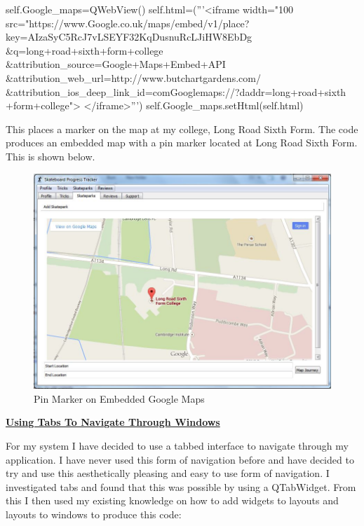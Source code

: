 \begin{python}
self.Google_maps=QWebView()
self.html=('''<iframe width="100%
src="https://www.Google.co.uk/maps/embed/v1/place?
	key=AIzaSyC5RcJ7vLSEYF32KqDusnuRcLJiHW8EbDg
	&q=long+road+sixth+form+college
	&attribution_source=Google+Maps+Embed+API
	&attribution_web_url=http://www.butchartgardens.com/
	&attribution_ios_deep_link_id=comGooglemaps://?daddr=long+road+sixth
	+form+college"> </iframe>''')
self.Google_maps.setHtml(self.html)
\end{python}

This places a marker on the map at my college, Long Road Sixth Form. The code produces an embedded map with a pin marker located at Long Road Sixth Form. This is shown below.

\begin{figure}[H]
    \includegraphics[width=\textwidth]{./Design/Prototype/PinMarker.JPG}
    \caption{Pin Marker on Embedded Google Maps} \label{fig:Tabs}
\end{figure}

\textbf{\underline{Using Tabs To Navigate Through Windows}}

For my system I have decided to use a tabbed interface to navigate through my application. I have never used this form of navigation before and have decided to try and use this aesthetically pleasing and easy to use form of navigation. I investigated tabs and found that this was possible by using a QTabWidget. From this I then used my existing knowledge on how to add widgets to layouts and layouts to windows to produce this code:

